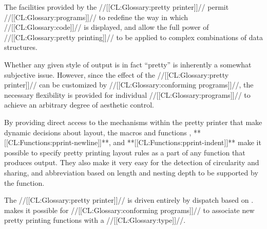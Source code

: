 



The facilities provided by the //[[CL:Glossary:pretty printer]]// permit //[[CL:Glossary:programs]]// to redefine the way in which //[[CL:Glossary:code]]// is displayed,  and allow the full power of //[[CL:Glossary:pretty printing]]// to be applied  to complex combinations of data structures.

Whether any given style of output is in fact ``pretty'' is inherently a somewhat subjective issue.  However, since the effect of the  //[[CL:Glossary:pretty printer]]// can be customized by //[[CL:Glossary:conforming programs]]//, the necessary flexibility is provided for individual //[[CL:Glossary:programs]]// to achieve an arbitrary degree of aesthetic control.

By providing direct access to the mechanisms within the pretty printer that make dynamic decisions about layout, the macros and functions , **[[CL:Functions:pprint-newline]]**, and **[[CL:Functions:pprint-indent]]** make it possible to specify pretty printing layout rules as a part of any function that produces output.  They also make it very easy for the detection of circularity and sharing, and abbreviation based on length and nesting depth to be supported by the function.

The //[[CL:Glossary:pretty printer]]// is driven entirely by dispatch based on .  makes it possible for //[[CL:Glossary:conforming programs]]// to associate new pretty printing  functions with a //[[CL:Glossary:type]]//.

